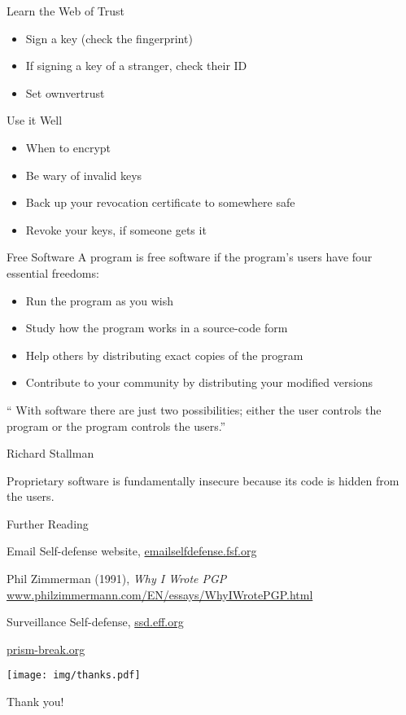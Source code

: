 \documentclass{beamer}
\begin{document}
\begin{frame}{Learn the Web of Trust}
  \begin{itemize}
  \item Sign a key (check the fingerprint)
  \item If signing a key of a stranger, check their ID
  \item Set ownvertrust
  \end{itemize}
\end{frame}

\begin{frame}{Use it Well}
  \begin{itemize}
  \item When to encrypt
  \item Be wary of invalid keys
  \item Back up your revocation certificate to somewhere safe
  \item Revoke your keys, if someone gets it
  \end{itemize}
\end{frame}

\begin{frame}{Free Software}
  A program is free software if the program's users have four essential freedoms:
  \begin{itemize}
  \item Run the program as you wish
  \item Study how the program works in a source-code form
  \item Help others by distributing exact copies of the program
  \item Contribute to your community by distributing your modified versions
  \end{itemize}

  \enquote{ With software there are just two possibilities; either the user controls the program or the program controls the users.}
  \begin{flushright}
    Richard Stallman
  \end{flushright}

  Proprietary software is fundamentally insecure because its code is hidden from the users.
\end{frame}

\begin{frame}{Further Reading}

  Email Self-defense website,
  \url{emailselfdefense.fsf.org}

  Phil Zimmerman (1991), \emph{Why I Wrote PGP}\\
  \url{www.philzimmermann.com/EN/essays/WhyIWrotePGP.html}

  Surveillance Self-defense,
  \url{ssd.eff.org}

  \url{prism-break.org}

\end{frame}


\begin{frame}

  \begin{center}
    \texttt{[image: img/thanks.pdf]}

    \Huge{Thank you!}
  \end{center}
\end{frame}
\end{document}
